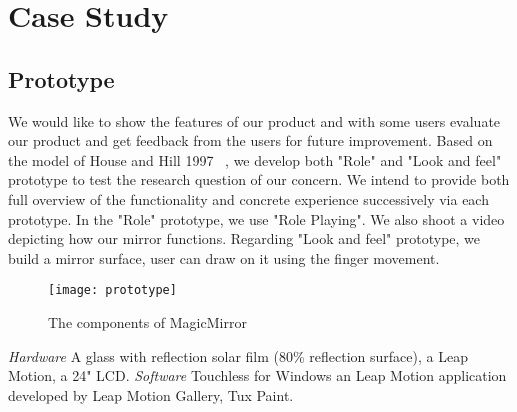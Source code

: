 
\section{Case Study}
\subsection{Prototype}
We would like to show the features of our product and with some users evaluate our product and get feedback from the users for future improvement.
Based on the model of House and Hill 1997 ~\cite{houdeChapter16What1997}, we develop both "Role" and "Look and feel" prototype to test the research question of our concern. We intend to provide both full overview of the functionality and concrete experience successively via each prototype.
In the "Role" prototype, we use "Role Playing". We also shoot a video depicting how our mirror functions. Regarding "Look and feel" prototype, we build a mirror surface, user can draw on it using the finger movement.
\begin{figure}[h]
\caption{The components of MagicMirror}
\centering
\texttt{[image: prototype]}
\end{figure}
\linebreak
\textit{Hardware}
A glass with reflection solar film (80\% reflection surface), a Leap Motion, a 24" LCD.
\textit{Software}
Touchless for Windows an Leap Motion application developed by Leap Motion Gallery, Tux Paint.

